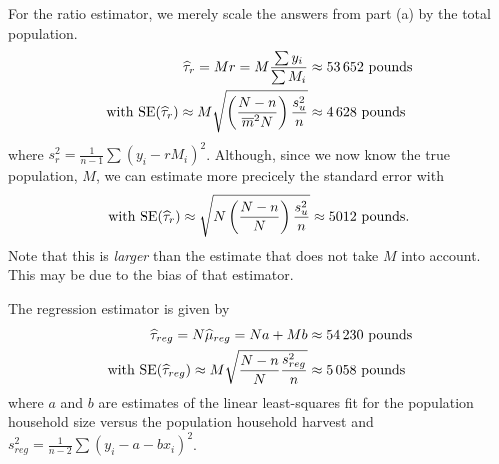 \documentclass[usenames,dvipsnames]{homework}
\begin{document}
\begin{solution}
  For the ratio estimator, we merely scale the answers from part (a) by the total population.
  \begin{align*}
    \widehat\tau_r = M r = M\frac{\sum y_i}{\sum M_i} &\approx 53\,652 \text{ pounds }\\ 
    \text{ with } \mathrm{SE}(\widehat\tau_r) \approx M\sqrt{\left(\frac {N-n}{\overline m^2N}\right) \frac{s_u^2}{n}} &\approx 4\,628\text{ pounds }
  \end{align*}
  where $s_r^2 = \frac 1{n-1}\sum(y_i - rM_i)^2$. Although, since we now know the true population, $M$, we can estimate more precicely the standard error with
  $$
    \text{ with } \mathrm{SE}(\widehat\tau_r) \approx \sqrt{N\left(\frac {N-n}{N}\right) \frac{s_u^2}{n}} \approx 5012 \text{ pounds. }
  $$
  Note that this is \emph{larger} than the estimate that does not take $M$ into account.  This may be due to the bias of that estimator.

  The regression estimator is given by
  \begin{align*}
    \widehat\tau_{reg} = N\widehat\mu_{reg} = Na + Mb  &\approx 54\,230\text{ pounds } \\
    \text{ with } \mathrm{SE}(\widehat\tau_{reg}) \approx M\sqrt{ \frac{N-n}N \frac{s_{reg}^2}{n}} &\approx 5\,058\text{ pounds }
  \end{align*}
  where $a$ and $b$ are estimates of the linear least-squares fit for the population household size versus the population household harvest and $s_{reg}^2 = \frac1{n-2}\sum(y_i-a-bx_i)^2$.


\end{solution}
\end{document}
